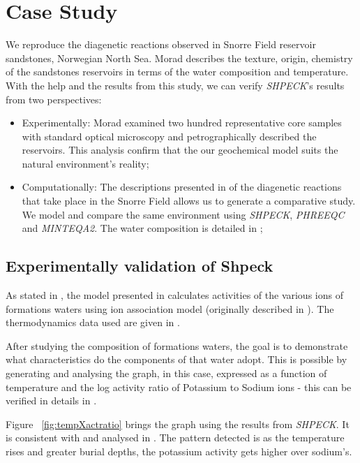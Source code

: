 \section{Case Study}
We reproduce the diagenetic reactions observed in Snorre Field reservoir sandstones, Norwegian North Sea. Morad \cite{Morad:90} describes the texture, origin, chemistry of the sandstones reservoirs in terms of the water composition and temperature. With the help and the results from this study, we  can verify \emph{SHPECK}'s results from two perspectives:
\begin{itemize}
    \item Experimentally: Morad examined two hundred representative core samples with standard optical microscopy and petrographically described the reservoirs. This analysis confirm that the our geochemical model suits the natural environment's reality;
    \item Computationally: The descriptions presented in \cite{Morad:90} of the diagenetic reactions that take place in the Snorre Field allows us to generate a comparative study. We model and compare the same environment using \emph{SHPECK}, \emph{PHREEQC} and \emph{MINTEQA2}. The water composition is detailed in \cite{Nordstrom:79};
\end{itemize}

\subsection{Experimentally validation of Shpeck}
As stated in \cite{Morad:90}, the model presented in \cite{Egeberg:88} calculates activities of the various ions of formations waters using ion association model (originally described in \cite{Wigley:77}). 
The thermodynamics data used are given in \cite{Helgeson:74a,  Helgeson:74b, Helgeson:76, Waltter:77, Helgeson:78, Helgeson:81}.

After studying the composition of formations waters, the goal is to demonstrate what characteristics do the components of that water adopt. 
This is possible by generating and analysing the graph, in this case, expressed as a function of temperature and the log activity ratio of Potassium to Sodium ions - this can be verified in details in \cite{Aagaard:90}. 

Figure ~\ref{fig:tempXactratio} brings the graph using the results from \emph{SHPECK}. 
It is consistent with \cite{Aagaard:90} and analysed in \cite{Morad:90}. The pattern detected is as the temperature rises and greater burial depths, the potassium activity gets higher over sodium's.


